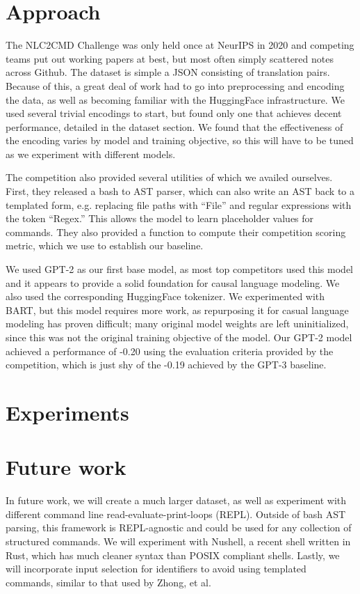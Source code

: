 \documentclass{article}
\begin{document}
\section{Approach}
The NLC2CMD Challenge was only held once at NeurIPS in 2020 and competing teams
put out working papers at best, but most often simply scattered notes across
Github. The dataset is simple a JSON consisting of translation pairs. Because
of this, a great deal of work had to go into preprocessing and encoding the
data, as well as becoming familiar with the HuggingFace infrastructure. We used
several trivial encodings to start, but found only one that achieves decent
performance, detailed in the dataset section. We found that the effectiveness
of the encoding varies by model and training objective, so this will have to be
tuned as we experiment with different models.
\par
The competition also provided several utilities of which we availed ourselves.
First, they released a bash to AST parser, which can also write an AST back to
a templated form, e.g. replacing file paths with ``File'' and regular
expressions with the token ``Regex.'' This allows the model to learn
placeholder values for commands. They also provided a function to compute their
competition scoring metric, which we use to establish our baseline.
\par
We used GPT-2 as our first base model, as most top competitors used this model
and it appears to provide a solid foundation for causal language modeling. We
also used the corresponding HuggingFace tokenizer. We experimented with BART,
but this model requires more work, as repurposing it for casual language
modeling has proven difficult; many original model weights are left
uninitialized, since this was not the original training objective of the model.
Our GPT-2 model achieved a performance of -0.20 using the evaluation criteria
provided by the competition, which is just shy of the -0.19 achieved by the
GPT-3 baseline.
\par

\section{Experiments}


\section{Future work}
In future work, we will create a much larger dataset, as well as experiment
with different command line read-evaluate-print-loops (REPL). Outside of bash
AST parsing, this framework is REPL-agnostic and could be used for any
collection of structured commands. We will experiment with Nushell, a
recent shell written in Rust, which has much cleaner syntax than POSIX
compliant shells. Lastly, we will incorporate input selection for identifiers
to avoid using templated commands, similar to that used by Zhong, et
al\cite{zhong2017seq2sql}.




\end{document}
